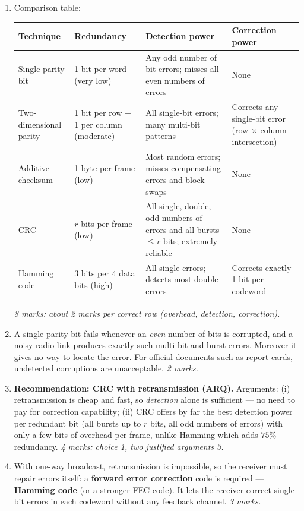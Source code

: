 \documentclass[11pt]{article}
\begin{document}
\begin{corrige}
\begin{enumerate}
\item Comparison table:
\begin{center}
\begin{tabularx}{\linewidth}{|l|X|X|X|}
\hline
\rowcolor{popblueL} Technique & Redundancy & Detection power & Correction power \\
\hline
Single parity bit & 1 bit per word (very low) & Any odd number of bit errors; misses all even numbers of errors & None \\
\hline
Two-dimensional parity & 1 bit per row + 1 per column (moderate) & All single-bit errors; many multi-bit patterns & Corrects any single-bit error (row $\times$ column intersection) \\
\hline
Additive checksum & 1 byte per frame (low) & Most random errors; misses compensating errors and block swaps & None \\
\hline
CRC & $r$ bits per frame (low) & All single, double, odd numbers of errors and all bursts $\leq r$ bits; extremely reliable & None \\
\hline
Hamming code & 3 bits per 4 data bits (high) & All single errors; detects most double errors & Corrects exactly 1 bit per codeword \\
\hline
\end{tabularx}
\end{center}
\hfill \emph{8 marks: about 2 marks per correct row (overhead, detection, correction).}
\item A single parity bit fails whenever an \emph{even} number of bits is corrupted, and a noisy radio link produces exactly such multi-bit and burst errors. Moreover it gives no way to locate the error. For official documents such as report cards, undetected corruptions are unacceptable. \hfill \emph{2 marks.}
\item \textbf{Recommendation: CRC with retransmission (ARQ).} Arguments: (i) retransmission is cheap and fast, so \emph{detection} alone is sufficient — no need to pay for correction capability; (ii) CRC offers by far the best detection power per redundant bit (all bursts up to $r$ bits, all odd numbers of errors) with only a few bits of overhead per frame, unlike Hamming which adds $75\%$ redundancy. \hfill \emph{4 marks: choice 1, two justified arguments 3.}
\item With one-way broadcast, retransmission is impossible, so the receiver must repair errors itself: a \textbf{forward error correction} code is required — \textbf{Hamming code} (or a stronger FEC code). It lets the receiver correct single-bit errors in each codeword without any feedback channel. \hfill \emph{3 marks.}

\end{enumerate}
\end{corrige}
\end{document}
